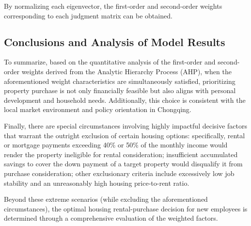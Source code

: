 \documentclass{mcmthesis}
\begin{document}

By normalizing each eigenvector, 
the first-order and second-order weights corresponding to each judgment matrix can be obtained.



\subsection{Conclusions and Analysis of Model Results}  %

To summarize, based on the quantitative analysis of the first-order and 
second-order weights derived from the Analytic Hierarchy Process (AHP), 
when the aforementioned weight characteristics are simultaneously satisfied,
prioritizing property purchase is not only financially feasible but also aligns with personal development and household needs.
Additionally, this choice is consistent with the local market environment and policy orientation in Chongqing.

Finally, there are special circumstances involving highly impactful decisive factors 
that warrant the outright exclusion of certain housing options: 
specifically, rental or mortgage payments exceeding 40\% or 50\% of the monthly income would render the property 
ineligible for rental consideration; insufficient accumulated savings 
to cover the down payment of a target property would disqualify it from purchase consideration; 
other exclusionary criteria include excessively low job stability and an unreasonably high housing price-to-rent ratio. 

Beyond these extreme scenarios (while excluding the aforementioned circumstances), 
the optimal housing rental-purchase decision for new employees is determined 
through a comprehensive evaluation of the weighted factors.
\end{document}

